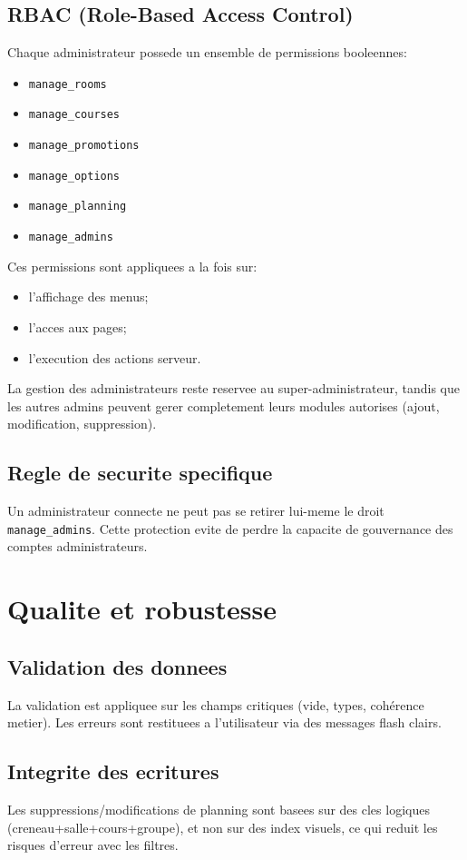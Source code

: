 \documentclass[12pt,a4paper]{article}
\begin{document}
\subsection{RBAC (Role-Based Access Control)}
Chaque administrateur possede un ensemble de permissions booleennes:
\begin{itemize}[leftmargin=1.2cm]
    \item \texttt{manage\_rooms}
    \item \texttt{manage\_courses}
    \item \texttt{manage\_promotions}
    \item \texttt{manage\_options}
    \item \texttt{manage\_planning}
    \item \texttt{manage\_admins}
\end{itemize}

Ces permissions sont appliquees a la fois sur:
\begin{itemize}[leftmargin=1.2cm]
    \item l'affichage des menus;
    \item l'acces aux pages;
    \item l'execution des actions serveur.
\end{itemize}

La gestion des administrateurs reste reservee au super-administrateur, tandis que les autres admins peuvent gerer completement leurs modules autorises (ajout, modification, suppression).

\subsection{Regle de securite specifique}
Un administrateur connecte ne peut pas se retirer lui-meme le droit \texttt{manage\_admins}. Cette protection evite de perdre la capacite de gouvernance des comptes administrateurs.

\section{Qualite et robustesse}
\subsection{Validation des donnees}
La validation est appliquee sur les champs critiques (vide, types, cohérence metier).
Les erreurs sont restituees a l'utilisateur via des messages flash clairs.

\subsection{Integrite des ecritures}
Les suppressions/modifications de planning sont basees sur des cles logiques (creneau+salle+cours+groupe), et non sur des index visuels, ce qui reduit les risques d'erreur avec les filtres.
\end{document}
